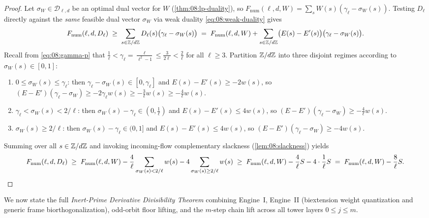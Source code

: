 \begin{proof}
Let $\sigma_W \in \mathcal{D}_{\ell, d}$ be an optimal dual vector for $W$ (\cref{thm:08:lp-duality}), so $F_{\mathrm{num}}(\ell, d, W) = \sum_s W(s)(\gamma_\ell - \sigma_W(s))$. Testing $D_\ell$ directly against the \emph{same} feasible dual vector $\sigma_W$ via weak duality \eqref{eq:08:weak-duality} gives
\[
  F_{\mathrm{num}}(\ell, d, D_\ell)
  \;\ge\; \sum_{s \in \mathbb{Z}/d\mathbb{Z}} D_\ell(s)\bigl(\gamma_\ell - \sigma_W(s)\bigr)
  \;=\; F_{\mathrm{num}}(\ell, d, W) + \sum_{s \in \mathbb{Z}/d\mathbb{Z}} \bigl(E(s) - E'(s)\bigr)\bigl(\gamma_\ell - \sigma_W(s)\bigr).
\]
Recall from \eqref{eq:08:gamma-p} that $\frac{1}{\ell} < \gamma_\ell = \frac{\ell}{\ell^2 - 1} \le \frac{3}{2\ell} < \frac{2}{\ell}$ for all $\ell \ge 3$. Partition $\mathbb{Z}/d\mathbb{Z}$ into three disjoint regimes according to $\sigma_W(s) \in [0, 1]$:
\begin{enumerate}[label=\textup{(\arabic*)}]
\item $0 \le \sigma_W(s) \le \gamma_\ell$: then $\gamma_\ell - \sigma_W(s) \in [0, \gamma_\ell]$ and $E(s) - E'(s) \ge -2w(s)$, so $(E - E')(\gamma_\ell - \sigma_W) \ge -2\gamma_\ell w(s) \ge -\frac{3}{\ell} w(s) \ge -\frac{4}{\ell} w(s)$.
\item $\gamma_\ell < \sigma_W(s) < 2/\ell$: then $\sigma_W(s) - \gamma_\ell \in (0, \frac{1}{\ell})$ and $E(s) - E'(s) \le 4w(s)$, so $(E - E')(\gamma_\ell - \sigma_W) \ge -\frac{4}{\ell} w(s)$.
\item $\sigma_W(s) \ge 2/\ell$: then $\sigma_W(s) - \gamma_\ell \in (0, 1]$ and $E(s) - E'(s) \le 4w(s)$, so $(E - E')(\gamma_\ell - \sigma_W) \ge -4 w(s)$.
\end{enumerate}
Summing over all $s \in \mathbb{Z}/d\mathbb{Z}$ and invoking incoming-flow complementary slackness (\cref{lem:08:slackness}) yields
\[
  F_{\mathrm{num}}(\ell, d, D_\ell)
  \;\ge\; F_{\mathrm{num}}(\ell, d, W) - \frac{4}{\ell}\sum_{\sigma_W(s) < 2/\ell} w(s) - 4\sum_{\sigma_W(s) \ge 2/\ell} w(s)
  \;\ge\; F_{\mathrm{num}}(\ell, d, W) - \frac{4}{\ell} S - 4 \cdot \frac{1}{\ell} S
  \;=\; F_{\mathrm{num}}(\ell, d, W) - \frac{8}{\ell} S. \qedhere
\]
\end{proof}

We now state the full \emph{Inert-Prime Derivative Divisibility Theorem} combining Engine~I, Engine~II (biextension weight quantization and generic frame biorthogonalization), odd-orbit floor lifting, and the $m$-step chain lift across all tower layers $0 \le j \le m$.

